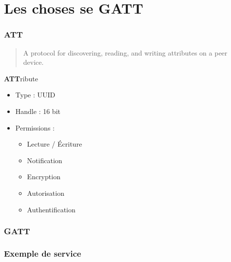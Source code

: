 \section{Les choses se GATT}

\begin{frame}
	\frametitle{ATT}
	\begin{quote}A protocol for discovering, reading, and writing attributes on a peer device.\end{quote}

	\begin{block}{\textbf{ATT}ribute}
		\begin{itemize}
			\item Type : UUID
			\item Handle : 16 bit
			\item Permissions :
				\begin{itemize}
					\item Lecture / Écriture
					\item Notification
					\item Encryption
					\item Autorisation
					\item Authentification
				\end{itemize}
		\end{itemize}
	\end{block}
\end{frame}

\begin{frame}
	\frametitle{GATT}
\end{frame}

\begin{frame}
	\frametitle{Exemple de service}
\end{frame}
